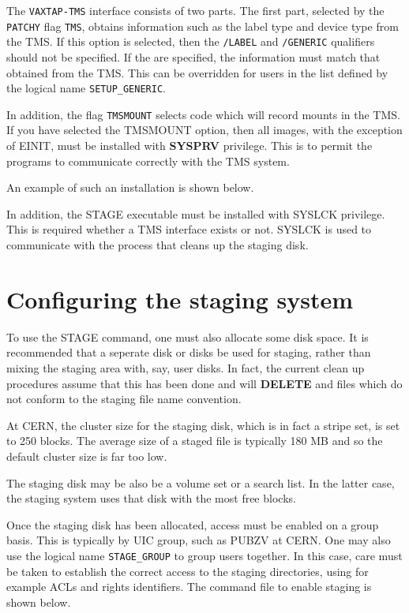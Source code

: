 The {\tt VAXTAP-TMS} interface consists of two parts. The first
part, selected by the {\tt PATCHY} flag {\tt TMS}, obtains
information such as the label type and device type from the
TMS. If this option is selected, then the {\tt /LABEL} and
{\tt /GENERIC} qualifiers should not be specified. If the
are specified, the information must match that obtained from
the TMS. This can be overridden for users in the list
defined by the logical name {\tt SETUP\_GENERIC}.


In addition, the flag {\tt TMSMOUNT} selects code which
will record mounts in the TMS.
If you have selected the TMSMOUNT option, then all images, with the exception
of EINIT, must be installed with {\bf SYSPRV} privilege. This is to
permit the programs to communicate correctly with the TMS system.

An example of such an installation is shown below.


In addition, the STAGE executable must be installed with SYSLCK privilege.
This is required whether a TMS interface exists or not. SYSLCK is used
to communicate with the process that cleans up the staging disk.
\section{Configuring the staging system}
\par
To use the STAGE command, one must also allocate some disk space.
It is recommended that a seperate disk or disks be used for
staging, rather than mixing the staging area with, say, user disks.
In fact, the current clean up procedures assume that this has been
done and will {\bf DELETE} and files which do not conform to the
staging file name convention.

At CERN, the cluster size for the staging disk, which is in fact
a stripe set, is set to 250 blocks. The average size of a staged
file is typically 180 MB and so the default cluster size is far
too low.

The staging disk may be also be a volume set or a search list.
In the latter case, the staging system uses that disk with
the most free blocks.

Once the staging disk has been allocated, access must be enabled
on a group basis. This is typically by UIC group, such as
PUBZV at CERN. One may also use the logical name {\tt STAGE\_GROUP}
to group users together. In this case, care must be taken to
establish the correct access to the staging directories, using
for example ACLs and rights identifiers. The command file to
enable staging is shown below.


